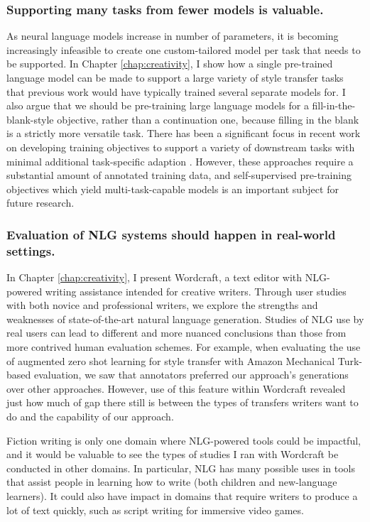 \subsubsection{Supporting many tasks from fewer models is valuable.}
	As neural language models increase in number of parameters, it is becoming increasingly infeasible to create one custom-tailored model per task that needs to be supported.
	In Chapter \ref{chap:creativity}, I show how a single pre-trained language model can be made to support a large variety of style transfer tasks that previous work would have typically trained several separate models for.
	I also argue that we should be pre-training large language models for a fill-in-the-blank-style objective, rather than a continuation one, because filling in the blank is a strictly more versatile task.
	There has been a significant focus in recent work on developing training objectives to support a variety of downstream tasks with minimal additional task-specific adaption \citep{wei2021finetuned,sanh2021multitask}.
	However, these approaches require a substantial amount of annotated training data, and self-supervised pre-training objectives which yield multi-task-capable models is an important subject for future research.

\subsubsection{Evaluation of NLG systems should happen in real-world settings.}
	In Chapter \ref{chap:creativity}, I present Wordcraft, a text editor with NLG-powered writing assistance intended for creative writers.
	Through user studies with both novice and professional writers, we explore the strengths and weaknesses of state-of-the-art natural language generation.
	Studies of NLG use by real users can lead to different and more nuanced conclusions than those from more contrived human evaluation schemes.
	For example, when evaluating the use of augmented zero shot learning for style transfer with Amazon Mechanical Turk-based evaluation, we saw that annotators preferred our approach's generations over other approaches.
	However, use of this feature within Wordcraft revealed just how much of gap there still is between the types of transfers writers want to do and the capability of our approach.

	Fiction writing is only one domain where NLG-powered tools could be impactful, and it would be valuable to see the types of studies I ran with Wordcraft be conducted in other domains.
	In particular, NLG has many possible uses in tools that assist people in learning how to write (both children and new-language learners).
	It could also have impact in domains that require writers to produce a lot of text quickly, such as script writing for immersive video games.

